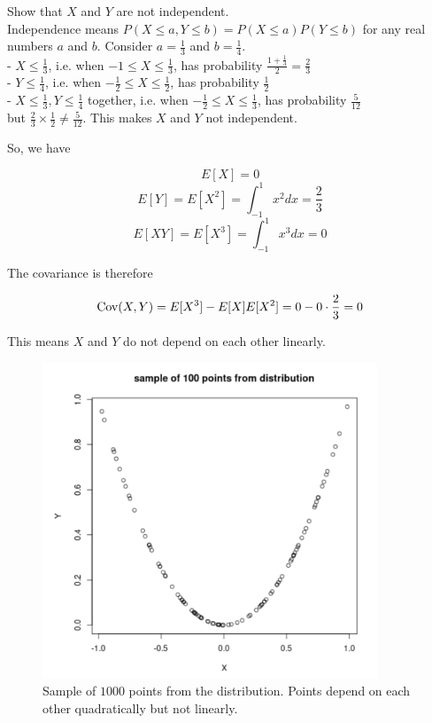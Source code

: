 \begin{texample}
	Show that $X$ and $Y$ are not independent. \\
	
	Independence means $P(X\le a, Y\le b)=P(X\le a) P(Y\le b)$ for any real numbers $a$ and $b$. Consider $a=\frac13$ and $b=\frac 14$. \\
	
	- $X \le \frac 13$, i.e. when $-1 \le X \le \frac13$, has probability $\frac{1+\frac13}{2}=\frac23$ \\
	- $Y \le \frac 14$, i.e. when $-\frac12 \le X \le \frac12$, has probability $\frac12$ \\
	- $X \le \frac 13, Y \le \frac 14$ together, i.e. when $-\frac12 \le X \le \frac13$, has probability $\frac5{12}$ \\
	
	but $\frac23 \times \frac12 \not=\frac5{12}$. This makes $X$ and $Y$ not independent.
\end{texample}

So, we have

$$E[X] = 0$$
$$E[Y] = E[X^2] = \int_{-1}^{1} x^2  dx = \frac23$$
$$E[XY] = E[X^3] = \int_{-1}^{1} x^3 dx = 0$$

The covariance is therefore

\[ \operatorname{Cov}(X,Y) = E[X^3] - E[X] E[X^2] = 0 - 0 \cdot \frac23 = 0 \]

This means $X$ and $Y$ do not depend on each other linearly.

\begin{figure}[H]
	\centering
	\includegraphics[width=100mm]{22.png}
	\caption{Sample of $1000$ points from the distribution. Points depend on each other quadratically but not linearly.}
\end{figure}

